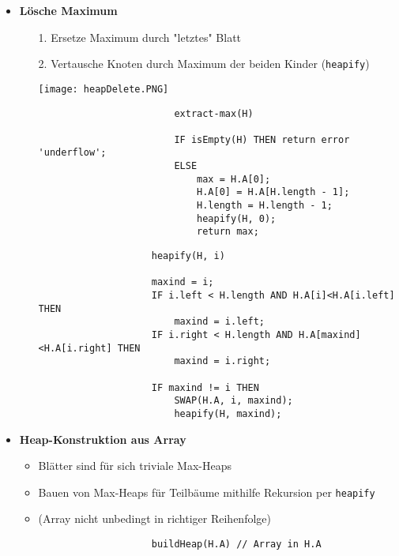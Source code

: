 \begin{itemize}
        \item \textbf{Lösche Maximum}
            \begin{itemize}
                \item[1.] Ersetze Maximum durch "letztes" Blatt
                \item[2.] Vertausche Knoten durch Maximum der beiden Kinder (\texttt{heapify})
                \item[]
                    \begin{minipage}{0.4\textwidth}
                        \texttt{[image: heapDelete.PNG]}
                    \end{minipage} 
                    \begin{minipage}{0.5\textwidth}
                        \begin{verbatim}
                        extract-max(H)

                        IF isEmpty(H) THEN return error 'underflow';
                        ELSE
                            max = H.A[0];
                            H.A[0] = H.A[H.length - 1];
                            H.length = H.length - 1;
                            heapify(H, 0);
                            return max;
                        \end{verbatim}
                    \end{minipage}
                \item[]
                    \begin{verbatim}
                    heapify(H, i)

                    maxind = i;
                    IF i.left < H.length AND H.A[i]<H.A[i.left] THEN
                        maxind = i.left;
                    IF i.right < H.length AND H.A[maxind]<H.A[i.right] THEN
                        maxind = i.right;

                    IF maxind != i THEN
                        SWAP(H.A, i, maxind);
                        heapify(H, maxind);
                    \end{verbatim}
            \end{itemize}

        \item \textbf{Heap-Konstruktion aus Array}
            \begin{itemize}
                \item Blätter sind für sich triviale Max-Heaps
                \item Bauen von Max-Heaps für Teilbäume mithilfe Rekursion per \texttt{heapify} 
                \item (Array nicht unbedingt in richtiger Reihenfolge)
                \item[]
                    \begin{verbatim}
                    buildHeap(H.A) // Array in H.A


\end{verbatim}
\end{itemize}
\end{itemize}
